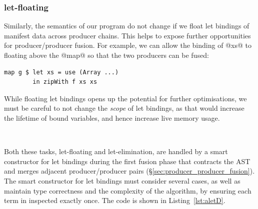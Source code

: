 \subsubsection{let-floating}

Similarly, the semantics of our program do not change if we float let bindings
of manifest data across producer chains. This helps to expose further
opportunities for producer/producer fusion. For example, we can allow the
binding of @xs@ to floating above the @map@ so that the two producers can be
fused:
%
\begin{lstlisting}[style=haskell]
map g $ let xs = use (Array ...)
        in zipWith f xs xs
\end{lstlisting}
%
While floating let bindings opens up the potential for further optimisations, we
must be careful to not change the \emph{scope} of let bindings, as that would
increase the lifetime of bound variables, and hence increase live memory usage.


\par{} %

Both these tasks, let-floating and let-elimination, are handled by a smart
constructor for let bindings during the first fusion phase that contracts the
AST and merges adjacent producer/producer pairs
(\S\ref{sec:producer_producer_fusion}). The smart constructor for let bindings
must consider several cases, as well as maintain type correctness and the
complexity of the algorithm, by ensuring each term in inspected exactly once.
The code is shown in Listing~\ref{lst:aletD}.

